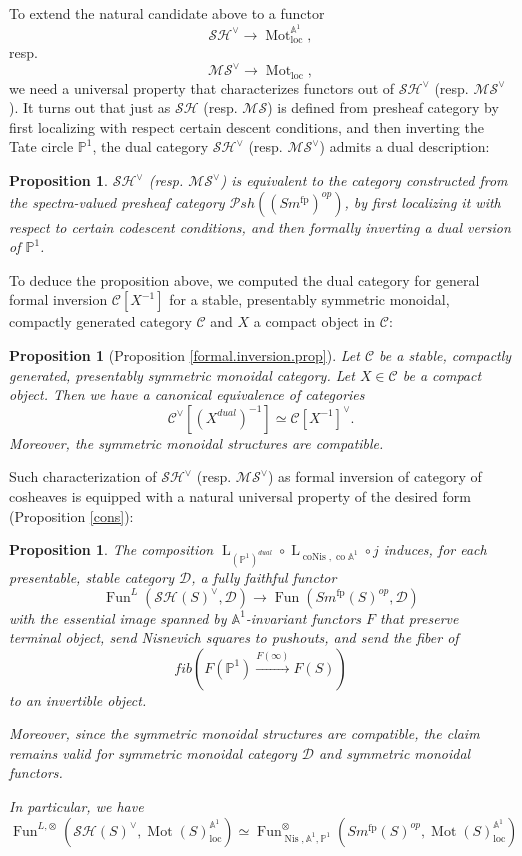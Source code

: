 \documentclass{article}
\newtheorem{prop}[thm]{Proposition}
\theoremstyle{definition}
\newcommand{\on}{\operatorname}
\begin{document}
To extend the natural candidate above to a functor \[\mathcal{SH}^\vee\rightarrow\on{Mot}_{\on{loc}}^{\mathbb{A}^1},\]
resp. \[\mathcal{MS}^\vee\rightarrow\on{Mot}_{\on{loc}},\]
we need a universal property that characterizes functors out of $\mathcal{SH}^\vee$ (resp. $\mathcal{MS}^\vee$). It turns out that just as $\mathcal{SH}$ (resp. $\mathcal{MS}$) is defined from presheaf category by first localizing with respect certain descent conditions, and then inverting the Tate circle $\mathbb{P}^1$, the dual category $\mathcal{SH}^\vee$ (resp. $\mathcal{MS}^\vee$) admits a dual description:
\begin{prop}
$\mathcal{SH}^\vee$ (resp. $\mathcal{MS}^\vee$) is equivalent to the category constructed from the spectra-valued presheaf category $\mathcal{P}sh((Sm^{\on{fp}})^{op})$, by first localizing it with respect to certain codescent conditions, and then formally inverting a dual version of $\mathbb{P}^1$.
\end{prop}
To deduce the proposition above, we computed the dual category for general formal inversion $\mathcal{C}[X^{-1}]$ for a stable, presentably symmetric monoidal, compactly generated category $\mathcal{C}$ and $X$ a compact object in $\mathcal{C}$:
\begin{prop}[Proposition \ref{formal.inversion.prop}]
Let $\mathcal{C}$ be a stable, compactly generated, presentably symmetric monoidal category. Let $X\in\mathcal{C}$ be a compact object. Then we have a canonical equivalence of categories
\[\mathcal{C}^\vee[(X^{dual})^{-1}]\simeq \mathcal{C}[X^{-1}]^\vee.\]
Moreover, the symmetric monoidal structures are compatible.
\end{prop}


Such characterization of $\mathcal{SH}^\vee$ (resp. $\mathcal{MS}^\vee$) as formal inversion of category of cosheaves is equipped with a natural universal property of the desired form (Proposition \ref{cons}):
\begin{prop}
The composition $\on{L}_{(\mathbb{P}^1)^{dual}}\circ\on{L}_{\on{coNis},\on{co}\mathbb{A}^1}\circ j$ induces, for each presentable, stable category $\mathcal{D}$, a fully faithful functor\[
\on{Fun}^L(\mathcal{SH}(S)^\vee,\mathcal{D})\rightarrow\on{Fun}(Sm^{\on{fp}}(S)^{op},\mathcal{D})
\]
with the essential image spanned by $\mathbb{A}^1$-invariant functors $F$ that preserve terminal object, send Nisnevich squares to pushouts, and send the fiber of \[fib(F(\mathbb{P}^1)\xrightarrow{F(\infty)}F(S))\]
to an invertible object.


Moreover, since the symmetric monoidal structures are compatible, the claim remains valid for symmetric monoidal category $\mathcal{D}$ and symmetric monoidal functors.


In particular, we have\[\on{Fun}^{L,\otimes}(\mathcal{SH}(S)^\vee,\on{Mot}(S)_{\on{loc}}^{\mathbb{A}^1})\simeq\on{Fun}^{\otimes}_{\on{Nis},\mathbb{A}^1,\mathbb{P}^1}(Sm^{\on{fp}}(S)^{op},\on{Mot}(S)_{\on{loc}}^{\mathbb{A}^1})
\]
\end{prop}
\end{document}
